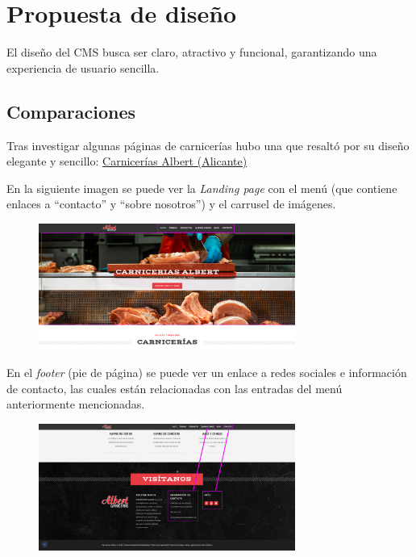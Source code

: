 \documentclass[a4paper]{article}
\newcommand{\textgap}{\vspace{1em}}
\begin{document}

\section{Propuesta de diseño}

El diseño del CMS busca ser claro, atractivo y funcional, garantizando una experiencia de usuario sencilla.

\subsection{Comparaciones}

Tras investigar algunas páginas de carnicerías hubo una que resaltó por su diseño elegante y sencillo:
\href{https://carniceriasalbert.com/}{Carnicerías Albert (Alicante)}

\textgap

En la siguiente imagen se puede ver la \textit{Landing page} con el menú (que contiene enlaces a ``contacto'' y ``sobre nosotros'') y el carrusel de imágenes.

\begin{figure}[H]
    \centering
    \includegraphics[width=0.75\textwidth]{images/landing-page.png}
\end{figure}

En el \textit{footer} (pie de página) se puede ver un enlace a redes sociales e información de contacto, las cuales están relacionadas con las entradas del menú anteriormente mencionadas.

\begin{figure}[H]
    \centering
    \includegraphics[width=0.75\textwidth]{images/footer.png}
\end{figure}
\end{document}
